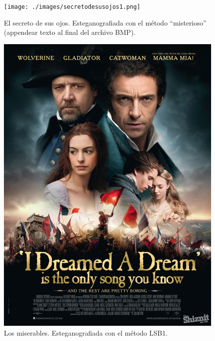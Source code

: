 \documentclass[a4paper,10pt]{article}
\begin{document}
\begin{figure}[!htb]
   \texttt{[image: ./images/secretodesusojos1.png]}
  \caption{El secreto de sus ojos. Esteganografiada con el método ``misterioso'' (appendear texto al final del archivo BMP).}\label{fig:awesome_image5}
\endminipage\hfill
{}
   \includegraphics[scale=0.15]{./images/miserables2.png}
  \caption{Los miserables. Esteganografiada con el método LSB1.}\label{fig:awesome_image6}
\endminipage\hfill
\end{figure}
\end{document}
